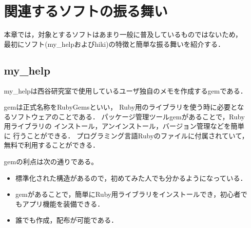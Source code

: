 \section{関連するソフトの振る舞い}
本章では，対象とするソフトはあまり一般に普及しているものではないため，
最初にソフト(my\_helpおよびhiki)の特徴と簡単な振る舞いを紹介する．

\subsection{my\_help}
my\_helpは西谷研究室で使用しているユーザ独自のメモを作成するgemである．

gemは正式名称をRubyGemsといい，
Ruby用のライブラリを使う時に必要となるソフトウェアのことである\cite{c}．
パッケージ管理ツールgemがあることで，Ruby用ライブラリの
インストール，アンインストール，バージョン管理などを簡単に
行うことができる．
プログラミング言語Rubyのファイルに付属されていて，
無料で利用することができる．

gemの利点は次の通りである。
\begin{itemize}
\item 標準化された構造があるので，初めてみた人でも分かるようになっている．
\item gemがあることで，簡単にRuby用ライブラリをインストールでき，初心者でもアプリ機能を装備できる．
\item 誰でも作成，配布が可能である．
\end{itemize}

